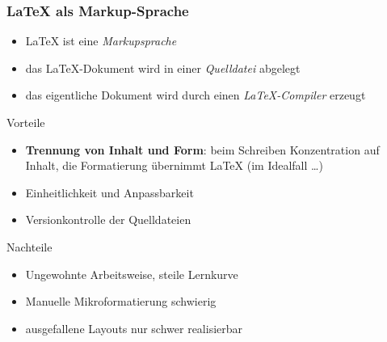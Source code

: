 \documentclass{cms-kurs}
\begin{document}
\begin{frame}
  \frametitle{\LaTeX{} als Markup-Sprache}

  \onslide<+->

  \begin{itemize}
  \item \LaTeX{} ist eine \emph{Markupsprache}
  \item das \LaTeX{}-Dokument wird in einer \emph{Quelldatei} abgelegt
  \item das eigentliche Dokument wird durch einen \emph{\LaTeX-Compiler}
    erzeugt
  \end{itemize}

  \onslide<+->

  \begin{block}{Vorteile}
    \begin{itemize}
    \item \textbf{Trennung von Inhalt und Form}: beim Schreiben
      Konzentration auf Inhalt, die Formatierung übernimmt \LaTeX{} (im
      Idealfall \dots)
    \item Einheitlichkeit und Anpassbarkeit
    \item Versionkontrolle der Quelldateien
    \end{itemize}
  \end{block}

  \onslide<+->

  \begin{block}{Nachteile}
    \begin{itemize}
    \item Ungewohnte Arbeitsweise, steile Lernkurve
    \item Manuelle Mikroformatierung schwierig
    \item ausgefallene Layouts nur schwer realisierbar
    \end{itemize}
  \end{block}

\end{frame}
\end{document}
